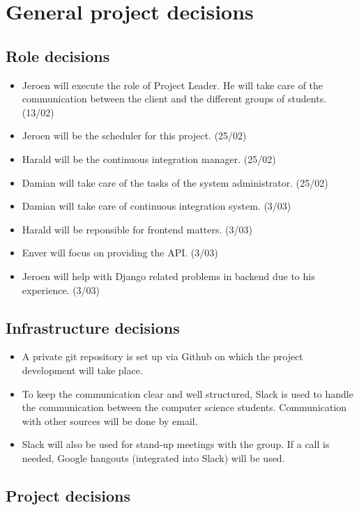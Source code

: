 \chapter{General project decisions}

\section{Role decisions}

\begin{itemize}
 \item Jeroen will execute the role of Project Leader. He will take care of the communication between the client and the different groups of students. (13/02)
 \item Jeroen will be the scheduler for this project. (25/02)
 \item Harald will be the continuous integration manager. (25/02)
 \item Damian will take care of the tasks of the system administrator. (25/02)
 \item Damian will take care of continuous integration system. (3/03)
 \item Harald will be reponsible for frontend matters. (3/03)
 \item Enver will focus on providing the API. (3/03)
 \item Jeroen will help with Django related problems in backend due to his experience. (3/03)
\end{itemize}


\section{Infrastructure decisions}
\begin{itemize}
	\item A private git repository is set up via Github on which the project development will take place.
    \item To keep the communication clear and well structured, Slack is used to handle the communication between the computer science students. Communication with other sources will be done by email.
    \item Slack will also be used for stand-up meetings with the group. If a call is needed, Google hangouts (integrated into Slack) will be used.
\end{itemize}

\section{Project decisions}
